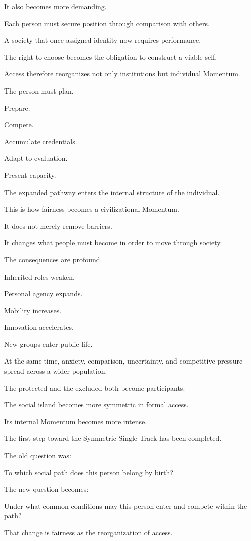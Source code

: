 It also becomes more demanding.

Each person must secure position through comparison with others.

A society that once assigned identity now requires performance.

The right to choose becomes the obligation to construct a viable self.

Access therefore reorganizes not only institutions but individual Momentum.

The person must plan.

Prepare.

Compete.

Accumulate credentials.

Adapt to evaluation.

Present capacity.

The expanded pathway enters the internal structure of the individual.

This is how fairness becomes a civilizational Momentum.

It does not merely remove barriers.

It changes what people must become in order to move through society.

The consequences are profound.

Inherited roles weaken.

Personal agency expands.

Mobility increases.

Innovation accelerates.

New groups enter public life.

At the same time, anxiety, comparison, uncertainty, and competitive pressure spread across a wider population.

The protected and the excluded both become participants.

The social island becomes more symmetric in formal access.

Its internal Momentum becomes more intense.

The first step toward the Symmetric Single Track has been completed.

The old question was:

To which social path does this person belong by birth?

The new question becomes:

Under what common conditions may this person enter and compete within the path?

That change is fairness as the reorganization of access.

